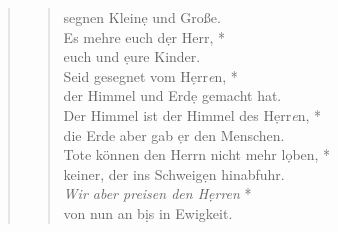 \begin{quote}
\begin{verse}
segnen Klein\d e und Große.\\ 
\vin Es mehre euch d\d er Herr, *\\ 
\vin euch und \d eure Kinder.\\  
Seid gesegnet vom H\d err\textit{e}n, *\\ 
der Himmel und Erd\d e gemacht hat.\\ 
\vin Der Himmel ist der Himmel des H\d err\textit{e}n, *\\ 
\vin die Erde aber gab \d er den Menschen.\\  
Tote können den Herrn nicht mehr l\d oben, *\\ 
keiner, der ins Schweig\d en hinabfuhr.\\ 
\vin \textit{Wir aber preisen den H\d err\textit{e}n} *\\ 
\vin von nun an b\d is in Ewigkeit.\\ 

\end{verse}
\end{quote}

\medskip
\vspace{0.3cm}
\def\greinitialformat#1{{\fontsize{40}{40}\selectfont #1}}
\gresetfirstlineaboveinitial{\small \textcolor{red}{ Eph 1}}{}
\setaboveinitialseparation{0.72mm}





